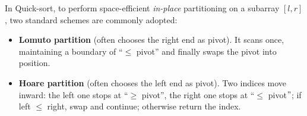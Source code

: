 
In Quick-sort, to perform space-efficient \emph{in-place} partitioning on a subarray $[l,r]$, two standard schemes are commonly adopted:


\begin{itemize}
  \item \textbf{Lomuto partition} (often chooses the right end as pivot). 
  It scans once, maintaining a boundary of ``$\leq$ pivot'' and finally swaps the pivot into position. 

  \item \textbf{Hoare partition} (often chooses the left end as pivot).
  Two indices move inward: the left one stops at ``$\geq$ pivot'', the right one stops at ``$\leq$ pivot$"$; if left $\leq$ right, swap and continue; otherwise return the index.

\end{itemize}

